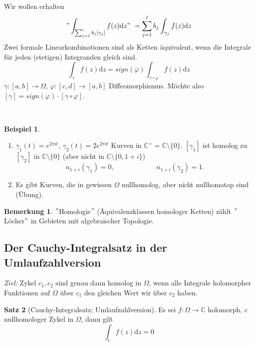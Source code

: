\documentclass[11pt,titlepage]{article}
\theoremstyle{definition}
\newtheorem{theorem}{Satz}[section]
\newtheorem{example}[theorem]{Beispiel}
\newtheorem{remark}{Bemerkung}
\theoremstyle{remark}
\begin{document}
	\ \\
	
	Wir wollen erhalten 
	\[ "\int_{\sum_{j=1}^l b_j [\gamma_j]}f(z)\mathrm{d}z"\  = \sum_{j=1}^l b_j \int_{\gamma_j}f(z)\mathrm{d}z \]
	Zwei formale Linearkombinationen sind als Ketten äquivalent, wenn die Integrale für jeden (stetigen) 
	Integranden gleich sind. 
	\[ \int_{\gamma}f(z)\mathrm{d}z=sign(\dot{\varphi})\int_{\gamma\circ\varphi}f(z)\mathrm{d}z \]
	$\gamma:[a,b]\to\Omega$, $\varphi:[c,d]\to[a,b]$ Diffeomorphismus. Möchte also $[\gamma]=
	sign(\dot{\varphi})\cdot [\gamma\circ\varphi]$.
	
	\ \\
	
	\begin{example}
		\begin{enumerate}
			\item $\gamma_1(t)=e^{2\pi it}$, $\gamma_2(t)=2e^{2\pi it}$ Kurven in $\mathbb{C}^{\times}
			=\mathbb{C}\setminus\{0\}$. $[\gamma_1]$ ist homolog zu $[\gamma_2]$ in $\mathbb{C}
			\setminus\{0\}$ (aber nicht in $\mathbb{C}\setminus\{0,1+i\}$)
			\[n_{1+i}(\gamma_1)=0,\qquad \qquad \qquad n_{1+i}(\gamma_2)=1.\]
			
			\item Es gibt Kurven, die in gewissen $\Omega$ nullhomolog, aber nicht nullhomotop sind 
			(Übung).
		\end{enumerate}
	\end{example}
	
	\begin{remark}
		$"$Homologie$"$ (Äquivalenzklassen homologer Ketten) zählt $"$Löcher$"$ in Gebieten mit 
		algebraischer Topologie.
	\end{remark}
	
	\subsection{Der Cauchy-Integralsatz in der Umlaufzahlversion}
	
	\textsl{Ziel:} Zykel $c_1, c_2$ sind genau dann homolog in $\Omega$, wenn alle Integrale holomorpher 
	Funktionen auf $\Omega$ über $c_1$ den gleichen Wert wir über $c_2$ haben.
	
	\begin{theorem}[Cauchy-Integralsatz; Umlaufzahlversion] \label{thm:CI;umlauf}
		Es sei $f:\Omega\to\mathbb{C}$ holomorph, $c$ nullhomologer Zykel in $\Omega$, dann gilt
		\[ \int_c f(z)\mathrm{d}z=0 \]
	\end{theorem}
	
\end{document}
